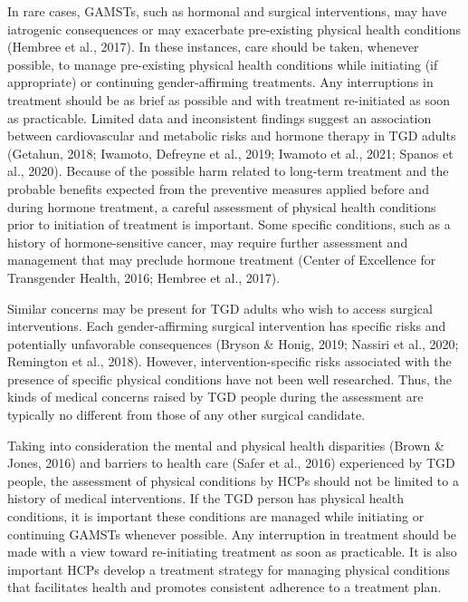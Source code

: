 \documentclass[
]{book}
\begin{document}
In rare cases, GAMSTs, such as hormonal and
surgical interventions, may have iatrogenic consequences or may exacerbate pre-existing physical
health conditions (Hembree et al., 2017). In these
instances, care should be taken, whenever possible, to manage pre-existing physical health conditions while initiating (if appropriate) or
continuing gender-affirming treatments. Any
interruptions in treatment should be as brief as
possible and with treatment re-initiated as soon
as practicable. Limited data and inconsistent findings suggest an association between cardiovascular and metabolic risks and hormone therapy in
TGD adults (Getahun, 2018; Iwamoto, Defreyne
et al., 2019; Iwamoto et al., 2021; Spanos et al.,
2020). Because of the possible harm related to
long-term treatment and the probable benefits
expected from the preventive measures applied
before and during hormone treatment, a careful
assessment of physical health conditions prior to
initiation of treatment is important. Some specific
conditions, such as a history of hormone-sensitive
cancer, may require further assessment and management that may preclude hormone treatment
(Center of Excellence for Transgender Health,
2016; Hembree et al., 2017).

Similar concerns may be present for TGD
adults who wish to access surgical interventions.
Each gender-affirming surgical intervention has
specific risks and potentially unfavorable consequences (Bryson \& Honig, 2019; Nassiri et al.,
2020; Remington et al., 2018). However,
intervention-specific risks associated with the
presence of specific physical conditions have not
been well researched. Thus, the kinds of medical
concerns raised by TGD people during the assessment are typically no different from those of any
other surgical candidate.

Taking into consideration the mental and physical health disparities (Brown \& Jones, 2016) and
barriers to health care (Safer et al., 2016) experienced by TGD people, the assessment of physical conditions by HCPs should not be limited
to a history of medical interventions. If the TGD
person has physical health conditions, it is
important these conditions are managed while
initiating or continuing GAMSTs whenever possible. Any interruption in treatment should be
made with a view toward re-initiating treatment
as soon as practicable. It is also important HCPs
develop a treatment strategy for managing physical conditions that facilitates health and promotes consistent adherence to a treatment plan.
\end{document}

